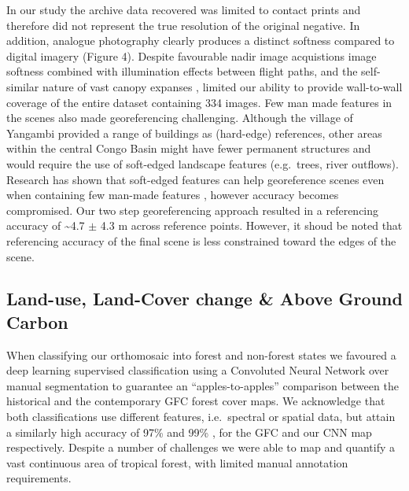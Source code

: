\documentclass[remote sensing,article,submit,moreauthors,pdftex,10pt,a4paper]{mdpi}
\begin{document}
In our study the archive data recovered was limited to contact prints
and therefore did not represent the true resolution of the original
negative. In addition, analogue photography clearly produces a distinct
softness compared to digital imagery (Figure 4). Despite favourable
nadir image acquistions \citep{verhoeven2017} image softness combined
with illumination effects between flight paths, and the self-similar
nature of vast canopy expanses \citep{park2019, simini2010, sole1995},
limited our ability to provide wall-to-wall coverage of the entire
dataset containing 334 images. Few man made features in the scenes also
made georeferencing challenging. Although the village of Yangambi
provided a range of buildings as (hard-edge) references, other areas
within the central Congo Basin might have fewer permanent structures and
would require the use of soft-edged landscape features (e.g.~trees,
river outflows). Research has shown that soft-edged features can help
georeference scenes even when containing few man-made features
\citep{hughes2006}, however accuracy becomes compromised. Our two step
georeferencing approach resulted in a referencing accuracy of
\textasciitilde{}4.7 \(\pm\) 4.3 m across reference points. However, it
shoud be noted that referencing accuracy of the final scene is less
constrained toward the edges of the scene.

\hypertarget{land-use-land-cover-change-above-ground-carbon}{%
\subsection{Land-use, Land-Cover change \& Above Ground
Carbon}\label{land-use-land-cover-change-above-ground-carbon}}

When classifying our orthomosaic into forest and non-forest states we
favoured a deep learning supervised classification using a Convoluted
Neural Network over manual segmentation to guarantee an
``apples-to-apples'' comparison between the historical and the
contemporary GFC forest cover maps. We acknowledge that both
classifications use different features, i.e.~spectral or spatial data,
but attain a similarly high accuracy of 97\% and 99\%
\citep{hansen2013}, for the GFC and our CNN map respectively. Despite a
number of challenges we were able to map and quantify a vast continuous
area of tropical forest, with limited manual annotation requirements.
\end{document}
